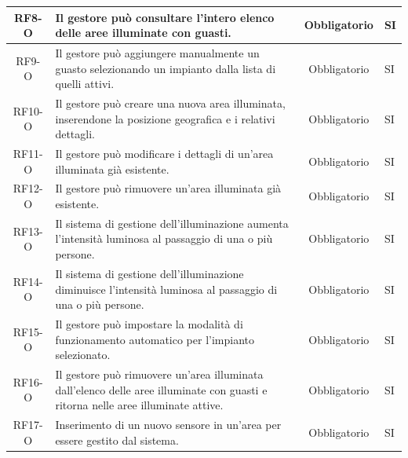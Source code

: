 \documentclass[a4paper, 11pt]{article}
\begin{document}
\begin{longtable}{|c|p{7cm}|c|p{4cm}|}
    \hline
    RF8-O           & Il gestore può consultare l'intero elenco delle aree illuminate con guasti.                                                                                   & Obbligatorio       & SI                   \\
    \hline
    RF9-O           & Il gestore può aggiungere manualmente un guasto selezionando un impianto dalla lista di quelli attivi.                                                        & Obbligatorio       & SI                   \\
    \hline
    RF10-O          & Il gestore può creare una nuova area illuminata, inserendone la posizione geografica e i relativi dettagli.                                                   & Obbligatorio       & SI                   \\
    \hline
    RF11-O          & Il gestore può modificare i dettagli di un'area illuminata già esistente.                                                                                     & Obbligatorio       & SI                   \\
    \hline
    RF12-O          & Il gestore può rimuovere un'area illuminata già esistente.                                                                                                    & Obbligatorio       & SI                   \\
    \hline
    RF13-O          & Il sistema di gestione dell'illuminazione aumenta l'intensità luminosa al passaggio di una o più persone.                                                     & Obbligatorio       & SI                   \\
    \hline
    RF14-O          & Il sistema di gestione dell'illuminazione diminuisce l'intensità luminosa al passaggio di una o più persone.                                                  & Obbligatorio       & SI                   \\
    \hline
    RF15-O          & Il gestore può impostare la modalità di funzionamento automatico per l'impianto selezionato.                                                                  & Obbligatorio       & SI                   \\
    \hline
    RF16-O          & Il gestore può rimuovere un'area illuminata dall'elenco delle aree illuminate con guasti e ritorna nelle aree illuminate attive.                              & Obbligatorio       & SI                   \\
    \hline
    RF17-O          & Inserimento di un nuovo sensore in un'area per essere gestito dal sistema.                                                                                    & Obbligatorio       & SI                   \\

\end{longtable}
\end{document}
